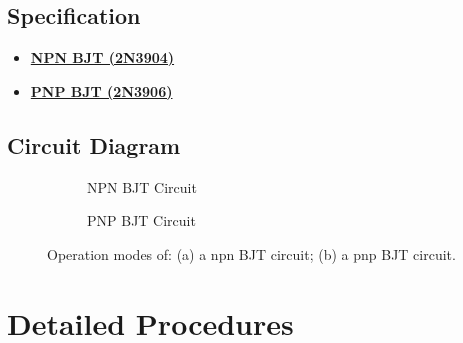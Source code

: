     \subsection{Specification}
        \begin{itemize}
            \item \hyperref[2N3904_1]{\textbf{NPN BJT (2N3904)}}
            \item \hyperref[2N3906_1]{\textbf{PNP BJT (2N3906)}}
        \end{itemize}
    \FloatBarrier
    
    \subsection{Circuit Diagram}
    \begin{figure}[h]
                    \centering
                    \begin{subfigure}[h]{0.45\textwidth}
                        \centering
                        
                        \caption{NPN BJT Circuit}
                        \label{lab5a}
                    \end{subfigure}
                    \hfill
                    \begin{subfigure}[h]{0.45\textwidth}
                        \centering
                        
                        \caption{PNP BJT Circuit}
                        \label{lab5b}
                    \end{subfigure}
    \caption{Operation modes of: (a) a npn BJT circuit; (b) a pnp BJT circuit.}
    \label{lab5f}
    \end{figure}
    \FloatBarrier


\section{Detailed Procedures}
